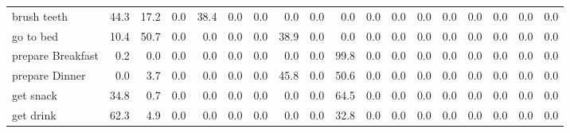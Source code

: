 \documentclass{article}
\begin{document}
\begin{sideways}
\begin{tabular}{lrrrrrrrrrrrrrrrrr}
brush teeth                   &        44.3 &               17.2 &           0.0 &              38.4 &                0.0 &                0.0 &              0.0 &                      0.0 &                   0.0 &              0.0 &              0.0 &                            0.0 &                      0.0 &                    0.0 &                                  0.0 &                          0.0 &                  0.0 \\
go to bed                     &        10.4 &               50.7 &           0.0 &               0.0 &                0.0 &                0.0 &             38.9 &                      0.0 &                   0.0 &              0.0 &              0.0 &                            0.0 &                      0.0 &                    0.0 &                                  0.0 &                          0.0 &                  0.0 \\
prepare Breakfast             &         0.2 &                0.0 &           0.0 &               0.0 &                0.0 &                0.0 &              0.0 &                      0.0 &                  99.8 &              0.0 &              0.0 &                            0.0 &                      0.0 &                    0.0 &                                  0.0 &                          0.0 &                  0.0 \\
prepare Dinner                &         0.0 &                3.7 &           0.0 &               0.0 &                0.0 &                0.0 &             45.8 &                      0.0 &                  50.6 &              0.0 &              0.0 &                            0.0 &                      0.0 &                    0.0 &                                  0.0 &                          0.0 &                  0.0 \\
get snack                     &        34.8 &                0.7 &           0.0 &               0.0 &                0.0 &                0.0 &              0.0 &                      0.0 &                  64.5 &              0.0 &              0.0 &                            0.0 &                      0.0 &                    0.0 &                                  0.0 &                          0.0 &                  0.0 \\
get drink                     &        62.3 &                4.9 &           0.0 &               0.0 &                0.0 &                0.0 &              0.0 &                      0.0 &                  32.8 &              0.0 &              0.0 &                            0.0 &                      0.0 &                    0.0 &                                  0.0 &                          0.0 &                  0.0 \\

\end{tabular}
\end{sideways}
\end{document}
